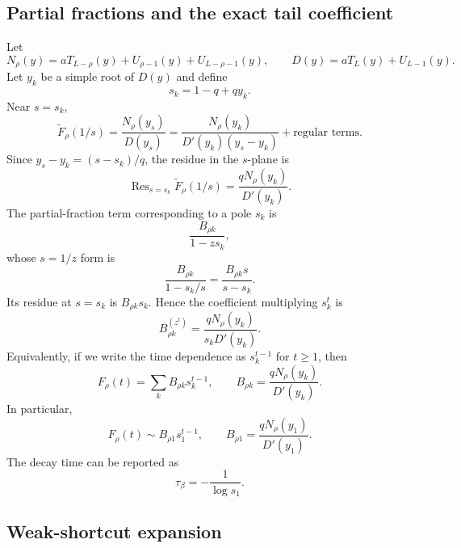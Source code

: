 \documentclass[11pt]{article}
\newcommand{\wt}{\widetilde}
\DeclareMathOperator{\Res}{Res}
\begin{document}
\subsection{Partial fractions and the exact tail coefficient}

Let
\begin{equation}
  N_\rho(y)=aT_{L-\rho}(y)+U_{\rho-1}(y)+U_{L-\rho-1}(y),
  \qquad
  D(y)=aT_L(y)+U_{L-1}(y).
\end{equation}
Let $y_k$ be a simple root of $D(y)$ and define
\begin{equation}
  s_k=1-q+qy_k.
\end{equation}
Near $s=s_k$,
\begin{equation}
  \wt F_\rho(1/s)=\frac{N_\rho(y_s)}{D(y_s)}
  =\frac{N_\rho(y_k)}{D'(y_k)(y_s-y_k)}+\text{regular terms}.
\end{equation}
Since $y_s-y_k=(s-s_k)/q$, the residue in the $s$-plane is
\begin{equation}
  \Res_{s=s_k}\wt F_\rho(1/s)=\frac{qN_\rho(y_k)}{D'(y_k)}.
\end{equation}
The partial-fraction term corresponding to a pole $s_k$ is
\begin{equation}
  \frac{B_{\rho k}}{1-zs_k},
\end{equation}
whose $s=1/z$ form is
\begin{equation}
  \frac{B_{\rho k}}{1-s_k/s}=\frac{B_{\rho k}s}{s-s_k}.
\end{equation}
Its residue at $s=s_k$ is $B_{\rho k}s_k$.  Hence the coefficient multiplying
$s_k^t$ is
\begin{equation}
  B_{\rho k}^{(z^t)}=\frac{qN_\rho(y_k)}{s_kD'(y_k)}.
\end{equation}
Equivalently, if we write the time dependence as $s_k^{t-1}$ for $t\geq1$, then
\begin{equation}
  \boxed{
  F_\rho(t)=\sum_k B_{\rho k}s_k^{t-1},
  \qquad
  B_{\rho k}=\frac{qN_\rho(y_k)}{D'(y_k)}.}
  \label{eq:partial-fraction-B}
\end{equation}
In particular,
\begin{equation}
  \boxed{
  F_\rho(t)\sim B_{\rho1}s_1^{t-1},
  \qquad
  B_{\rho1}=\frac{qN_\rho(y_1)}{D'(y_1)}.}
  \label{eq:tail-coefficient}
\end{equation}
The decay time can be reported as
\begin{equation}
  \boxed{\tau_\beta=-\frac{1}{\log s_1}.}
  \label{eq:tau-beta}
\end{equation}

\subsection{Weak-shortcut expansion}
\end{document}
